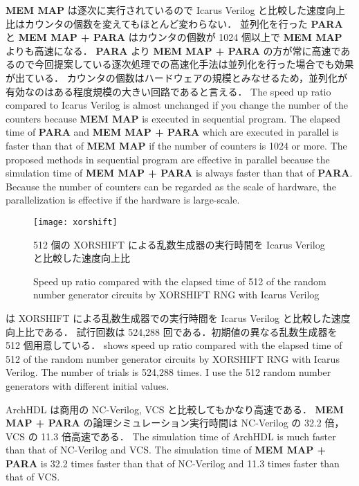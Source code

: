 \textbf{MEM MAP} は逐次に実行されているので Icarus Verilog と比較した速度向上比はカウンタの個数を変えてもほとんど変わらない．
並列化を行った \textbf{PARA} と \textbf{MEM MAP + PARA} はカウンタの個数が 1024 個以上で \textbf{MEM MAP} よりも高速になる．
\textbf{PARA} より \textbf{MEM MAP + PARA} の方が常に高速であるので今回提案している逐次処理での高速化手法は並列化を行った場合でも効果が出ている．
カウンタの個数はハードウェアの規模とみなせるため，並列化が有効なのはある程度規模の大きい回路であると言える．
\fi
The speed up ratio compared to Icarus Verilog is almost unchanged if you change the number of the counters because \textbf{MEM MAP} is executed in sequential program.
The elapsed time of \textbf{PARA} and \textbf{MEM MAP + PARA} which are executed in parallel is faster than that of \textbf{MEM MAP} if the number of counters is 1024 or more.
The proposed methods in sequential program are effective in parallel
because the simulation time of \textbf{MEM MAP + PARA} is always faster than that of \textbf{PARA}.
Because the number of counters can be regarded as the scale of hardware, the parallelization is effective if the hardware is large-scale.


\begin{figure}[tb]
 \centering
 \texttt{[image: xorshift]}
 \caption{512 個の XORSHIFT による乱数生成器の実行時間を Icarus Verilog と比較した速度向上比}
\fi
 \caption{Speed up ratio compared with the elapsed time of 512 of the random number generator circuits by XORSHIFT RNG with Icarus Verilog}
 \label{fig:xorshift}
\end{figure}

 は XORSHIFT による乱数生成器での実行時間を Icarus Verilog と比較した速度向上比である．
試行回数は 524,288 回である．初期値の異なる乱数生成器を 512 個用意している．
\fi
{} shows speed up ratio compared with the elapsed time of 512 of the random number generator circuits by XORSHIFT RNG with Icarus Verilog.
The number of trials is 524,288 times.
I use the 512 random number generators with different initial values.

ArchHDL は商用の NC-Verilog, VCS と比較してもかなり高速である．
\textbf{MEM MAP + PARA} の論理シミュレーション実行時間は NC-Verilog の 32.2 倍，VCS の 11.3 倍高速である．
\fi
The simulation time of ArchHDL is much faster than that of NC-Verilog and VCS.
The simulation time of \textbf{MEM MAP + PARA} is 32.2 times faster than that of NC-Verilog and 11.3 times faster than that of VCS.


